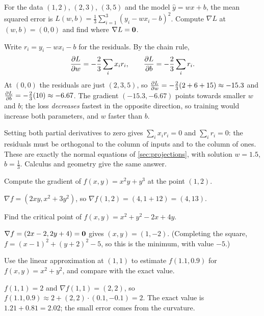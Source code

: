 \begin{example}\label{ex:regression-gradient}
For the data $(1, 2)$, $(2, 3)$, $(3, 5)$ and the model $\hat y = wx + b$, the
mean squared error is $L(w, b) = \frac13\sum_{i=1}^3(y_i - wx_i - b)^2$. Compute
$\nabla L$ at $(w, b) = (0, 0)$ and find where $\nabla L = \bm{0}$.

\sol Write $r_i = y_i - wx_i - b$ for the residuals. By the chain rule,
\[
  \frac{\partial L}{\partial w} = -\frac23\sum_i x_ir_i, \qquad
  \frac{\partial L}{\partial b} = -\frac23\sum_i r_i .
\]
At $(0, 0)$ the residuals are just $(2, 3, 5)$, so
$\frac{\partial L}{\partial w} = -\frac23(2 + 6 + 15) \approx -15.3$ and
$\frac{\partial L}{\partial b} = -\frac23(10) \approx -6.67$. The gradient
$(-15.3, -6.67)$ points towards smaller $w$ and $b$; the loss \emph{decreases}
fastest in the opposite direction, so training would increase both
parameters, and $w$ faster than $b$.

Setting both partial derivatives to zero gives $\sum_i x_ir_i = 0$ and
$\sum_i r_i = 0$: the residuals must be orthogonal to the column of inputs and
to the column of ones. These are exactly the normal equations of
\cref{sec:projections}, with solution $w = 1.5$, $b = \frac13$. Calculus and
geometry give the same answer.
\end{example}

\sectionexercises

\begin{exercise}
Compute the gradient of $f(x, y) = x^2y + y^3$ at the point $(1, 2)$.
\end{exercise}
\begin{solution}
$\nabla f = (2xy, x^2 + 3y^2)$, so $\nabla f(1, 2) = (4, 1 + 12) = (4, 13)$.
\end{solution}

\begin{exercise}
Find the critical point of $f(x, y) = x^2 + y^2 - 2x + 4y$.
\end{exercise}
\begin{solution}
$\nabla f = (2x - 2, 2y + 4) = \bm{0}$ gives $(x, y) = (1, -2)$. (Completing the
square, $f = (x - 1)^2 + (y + 2)^2 - 5$, so this is the minimum, with value
$-5$.)
\end{solution}

\begin{exercise}
Use the linear approximation at $(1, 1)$ to estimate $f(1.1, 0.9)$ for
$f(x, y) = x^2 + y^2$, and compare with the exact value.
\end{exercise}
\begin{solution}
$f(1, 1) = 2$ and $\nabla f(1,1) = (2, 2)$, so
$f(1.1, 0.9) \approx 2 + (2, 2)\cdot(0.1, -0.1) = 2$. The exact value is
$1.21 + 0.81 = 2.02$; the small error comes from the curvature.
\end{solution}

